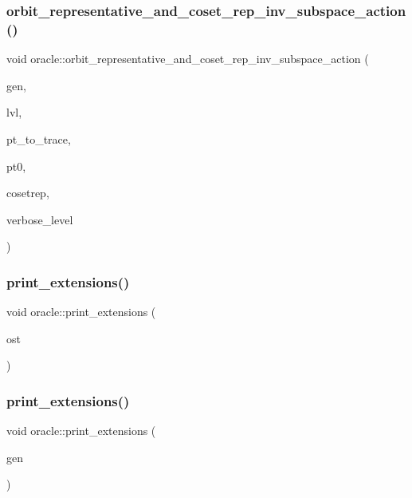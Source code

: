 \subsubsection{\texorpdfstring{orbit\+\_\+representative\+\_\+and\+\_\+coset\+\_\+rep\+\_\+inv\+\_\+subspace\+\_\+action()}{orbit\_representative\_and\_coset\_rep\_inv\_subspace\_action()}}
{\footnotesize\ttfamily void oracle\+::orbit\+\_\+representative\+\_\+and\+\_\+coset\+\_\+rep\+\_\+inv\+\_\+subspace\+\_\+action (\begin{DoxyParamCaption}\item[{\mbox{\hyperlink{classgenerator}{generator}} $\ast$}]{gen,  }\item[{\mbox{\hyperlink{galois_8h_a09fddde158a3a20bd2dcadb609de11dc}{I\+NT}}}]{lvl,  }\item[{\mbox{\hyperlink{galois_8h_a09fddde158a3a20bd2dcadb609de11dc}{I\+NT}}}]{pt\+\_\+to\+\_\+trace,  }\item[{\mbox{\hyperlink{galois_8h_a09fddde158a3a20bd2dcadb609de11dc}{I\+NT}} \&}]{pt0,  }\item[{\mbox{\hyperlink{galois_8h_a09fddde158a3a20bd2dcadb609de11dc}{I\+NT}} $\ast$\&}]{cosetrep,  }\item[{\mbox{\hyperlink{galois_8h_a09fddde158a3a20bd2dcadb609de11dc}{I\+NT}}}]{verbose\+\_\+level }\end{DoxyParamCaption})}

\mbox{\label{classoracle_a6ea212ee0158a6c6146d54f79ba0e9f3}} 
\subsubsection{\texorpdfstring{print\+\_\+extensions()}{print\_extensions()}\hspace{0.1cm}{\footnotesize\ttfamily [1/2]}}
{\footnotesize\ttfamily void oracle\+::print\+\_\+extensions (\begin{DoxyParamCaption}\item[{ostream \&}]{ost }\end{DoxyParamCaption})}

\mbox{\label{classoracle_a0f52757cf7b3c1bf5c0d96811ac3a858}} 
\subsubsection{\texorpdfstring{print\+\_\+extensions()}{print\_extensions()}\hspace{0.1cm}{\footnotesize\ttfamily [2/2]}}
{\footnotesize\ttfamily void oracle\+::print\+\_\+extensions (\begin{DoxyParamCaption}\item[{\mbox{\hyperlink{classgenerator}{generator}} $\ast$}]{gen }\end{DoxyParamCaption})}

